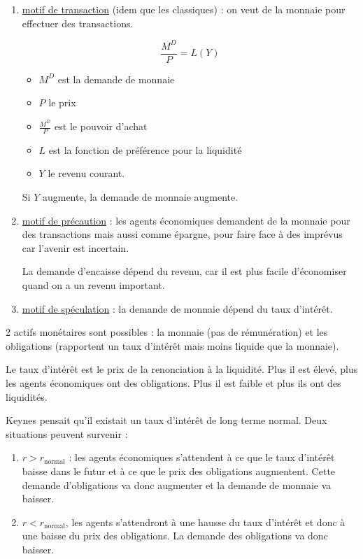 	\begin{enumerate}
		\item \underline{motif de transaction} (idem que les classiques) : on veut de la monnaie pour effectuer des transactions.
		
		$$\frac{M^D}{P} = L(Y)$$
		
		\begin{itemize}
			\item $M^D$ est la demande de monnaie
			\item $P$ le prix
			\item $\frac{M^D}{P}$ est le pouvoir d'achat
			\item $L$ est la fonction de préférence pour la liquidité
			\item $Y$ le revenu courant.
		\end{itemize}
			
		Si $Y$ augmente, la demande de monnaie augmente.
		
		\item \underline{motif de précaution} : les agents économiques demandent de la monnaie pour des transactions mais aussi comme épargne, pour faire face à des imprévus car l'avenir est incertain.
		
		La demande d'encaisse dépend du revenu, car il est plus facile d'économiser quand on a un revenu important.
		
		\item \underline{motif de spéculation} : la demande de monnaie dépend du taux d'intérêt.
	\end{enumerate}
	
	2 actifs monétaires sont possibles : la monnaie (pas de rémunération) et les obligations (rapportent un taux d'intérêt mais moins liquide que la monnaie).
	
	Le taux d'intérêt est le prix de la renonciation à la liquidité. Plus il est élevé, plus les agents économiques ont des obligations. Plus il est faible et plus ils ont des liquidités.
	
	Keynes pensait qu'il existait un taux d'intérêt de long terme normal. Deux situations peuvent survenir :
	
	\begin{enumerate}
		\item $r > r_{\text{normal}}$ : les agents économiques s'attendent à ce que le taux d'intérêt baisse dans le futur et à ce que le prix des obligations augmentent. Cette demande d'obligations va donc augmenter et la demande de monnaie va baisser.
		
		\item $r < r_{\text{normal}}$, les agents s'attendront à une hausse du taux d'intérêt et donc à une baisse du prix des obligations. La demande des obligations va donc baisser.
	\end{enumerate}
		
